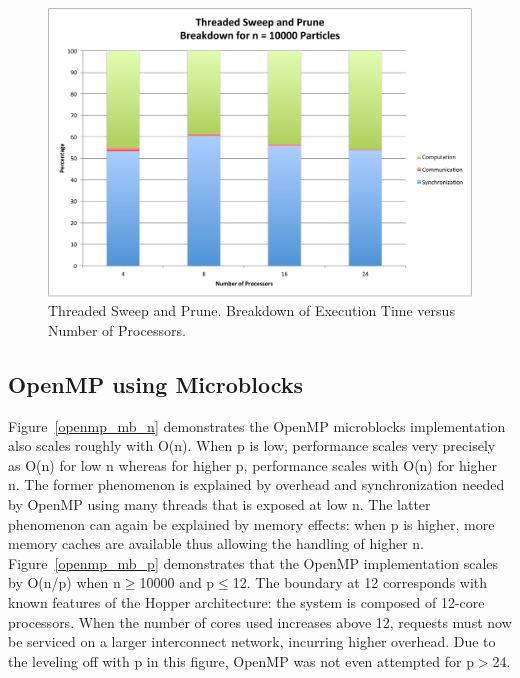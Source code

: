 \documentclass[11pt]{article} %
\begin{document}
\begin{figure}
\begin{centering}
\includegraphics[width=0.5\paperwidth]{figures/thread_breakdown_10000}
\par\end{centering}

\caption{Threaded Sweep and Prune. Breakdown of Execution Time versus Number
of Processors.}
\label{plot:thread_breakdown_10000}
\end{figure}

\subsection{OpenMP using Microblocks}

Figure~\ref{openmp_mb_n}  demonstrates the OpenMP microblocks implementation also scales roughly with O(n). When p is low, performance scales very precisely as O(n) for low n whereas for higher p, performance scales with O(n) for higher n. The former phenomenon is explained by overhead and synchronization needed by OpenMP using many threads that is exposed at low n. The latter phenomenon can again be explained by memory effects: when p is higher, more memory caches are available thus allowing the handling of higher n. Figure~\ref{openmp_mb_p} demonstrates that the OpenMP implementation scales by O(n/p) when n$\geq$10000 and p$\leq$12. The boundary at 12 corresponds with known features of the Hopper architecture: the system is composed of 12-core processors. When the number of cores used increases above 12, requests must now be serviced on a larger interconnect network, incurring higher overhead. Due to the leveling off with p in this figure, OpenMP was not even attempted for p$>$24.
\end{document}
